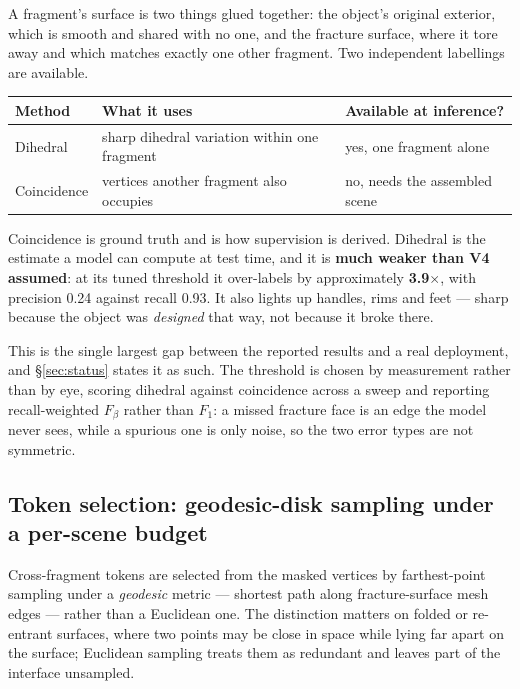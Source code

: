 \documentclass[11pt,a4paper]{report}
\newcommand{\measured}[1]{\textbf{#1}}
\begin{document}
A fragment's surface is two things glued together: the object's original
exterior, which is smooth and shared with no one, and the fracture surface,
where it tore away and which matches exactly one other fragment. Two independent
labellings are available.

\begin{table}[h]
\centering
\small
\begin{tabular}{lll}
\toprule
\textbf{Method} & \textbf{What it uses} & \textbf{Available at inference?} \\
\midrule
Dihedral & sharp dihedral variation within one fragment & yes, one fragment alone \\
Coincidence & vertices another fragment also occupies & no, needs the assembled scene \\
\bottomrule
\end{tabular}
\end{table}

Coincidence is ground truth and is how supervision is derived. Dihedral is the
estimate a model can compute at test time, and it is \measured{much weaker than
V4 assumed}: at its tuned threshold it over-labels by approximately
\measured{3.9$\times$}, with precision 0.24 against recall 0.93. It also lights
up handles, rims and feet --- sharp because the object was \emph{designed} that
way, not because it broke there.

This is the single largest gap between the reported results and a real
deployment, and \S\ref{sec:status} states it as such. The threshold is chosen by measurement
rather than by eye, scoring dihedral against coincidence across a sweep and
reporting recall-weighted $F_\beta$ rather than $F_1$: a missed fracture face is
an edge the model never sees, while a spurious one is only noise, so the two
error types are not symmetric.

\subsection{Token selection: geodesic-disk sampling under a per-scene budget}
\label{sub:sampling}

Cross-fragment tokens are selected from the masked vertices by farthest-point
sampling under a \emph{geodesic} metric --- shortest path along fracture-surface
mesh edges --- rather than a Euclidean one. The distinction matters on folded or
re-entrant surfaces, where two points may be close in space while lying far
apart on the surface; Euclidean sampling treats them as redundant and leaves
part of the interface unsampled.
\end{document}
